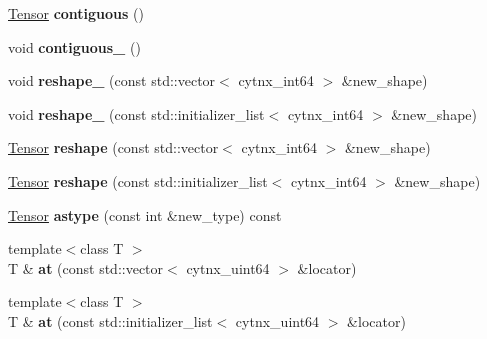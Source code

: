\begin{DoxyCompactItemize}
\item 
\mbox{\label{classcytnx_1_1Tensor_a127e50508e1ee0eadf11601d66d76988}} 
\hyperlink{classcytnx_1_1Tensor}{Tensor} {\bfseries contiguous} ()
\item 
\mbox{\label{classcytnx_1_1Tensor_a405470654ef4ef5fc0b1d24754a3daf9}} 
void {\bfseries contiguous\+\_\+} ()
\item 
\mbox{\label{classcytnx_1_1Tensor_a3723449528b9a20dd46c32c9e042b8f0}} 
void {\bfseries reshape\+\_\+} (const std\+::vector$<$ cytnx\+\_\+int64 $>$ \&new\+\_\+shape)
\item 
\mbox{\label{classcytnx_1_1Tensor_a68a1e158cc84a6109117b19882377563}} 
void {\bfseries reshape\+\_\+} (const std\+::initializer\+\_\+list$<$ cytnx\+\_\+int64 $>$ \&new\+\_\+shape)
\item 
\mbox{\label{classcytnx_1_1Tensor_a182f8f7b3ae3d0db8ed55d2adf8c6b45}} 
\hyperlink{classcytnx_1_1Tensor}{Tensor} {\bfseries reshape} (const std\+::vector$<$ cytnx\+\_\+int64 $>$ \&new\+\_\+shape)
\item 
\mbox{\label{classcytnx_1_1Tensor_aaea8f70a35d4f8417f988da922088ff2}} 
\hyperlink{classcytnx_1_1Tensor}{Tensor} {\bfseries reshape} (const std\+::initializer\+\_\+list$<$ cytnx\+\_\+int64 $>$ \&new\+\_\+shape)
\item 
\mbox{\label{classcytnx_1_1Tensor_a7b996d3281e7375b29a7cfe4273b299f}} 
\hyperlink{classcytnx_1_1Tensor}{Tensor} {\bfseries astype} (const int \&new\+\_\+type) const
\item 
\mbox{\label{classcytnx_1_1Tensor_a697b114d1df390ca558ea9211c2d683b}} 
{\footnotesize template$<$class T $>$ }\\T \& {\bfseries at} (const std\+::vector$<$ cytnx\+\_\+uint64 $>$ \&locator)
\item 
\mbox{\label{classcytnx_1_1Tensor_a55d27a38f230d115c5f0c2ee2896117f}} 
{\footnotesize template$<$class T $>$ }\\T \& {\bfseries at} (const std\+::initializer\+\_\+list$<$ cytnx\+\_\+uint64 $>$ \&locator)

\end{DoxyCompactItemize}
